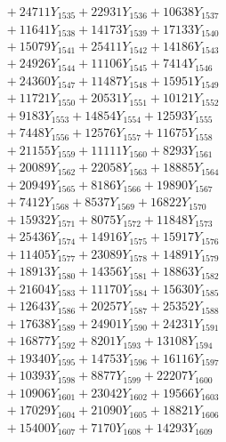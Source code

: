 \documentclass[a4paper,10pt]{article}
\begin{document}
{\begin{align}
&\;  + 24711 Y_{1535} + 22931 Y_{1536} + 10638 Y_{1537} \\[0.3ex]
&\;  + 11641 Y_{1538} + 14173 Y_{1539} + 17133 Y_{1540} \\[0.3ex]
&\;  + 15079 Y_{1541} + 25411 Y_{1542} + 14186 Y_{1543} \\[0.3ex]
&\;  + 24926 Y_{1544} + 11106 Y_{1545} + 7414 Y_{1546} \\[0.3ex]
&\;  + 24360 Y_{1547} + 11487 Y_{1548} + 15951 Y_{1549} \\[0.3ex]
&\;  + 11721 Y_{1550} + 20531 Y_{1551} + 10121 Y_{1552} \\[0.3ex]
&\;  + 9183 Y_{1553} + 14854 Y_{1554} + 12593 Y_{1555} \\[0.3ex]
&\;  + 7448 Y_{1556} + 12576 Y_{1557} + 11675 Y_{1558} \\[0.5ex]\allowbreak
&\;  + 21155 Y_{1559} + 11111 Y_{1560} + 8293 Y_{1561} \\[0.3ex]
&\;  + 20089 Y_{1562} + 22058 Y_{1563} + 18885 Y_{1564} \\[0.3ex]
&\;  + 20949 Y_{1565} + 8186 Y_{1566} + 19890 Y_{1567} \\[0.3ex]
&\;  + 7412 Y_{1568} + 8537 Y_{1569} + 16822 Y_{1570} \\[0.3ex]
&\;  + 15932 Y_{1571} + 8075 Y_{1572} + 11848 Y_{1573} \\[0.3ex]
&\;  + 25436 Y_{1574} + 14916 Y_{1575} + 15917 Y_{1576} \\[0.3ex]
&\;  + 11405 Y_{1577} + 23089 Y_{1578} + 14891 Y_{1579} \\[0.3ex]
&\;  + 18913 Y_{1580} + 14356 Y_{1581} + 18863 Y_{1582} \\[0.3ex]
&\;  + 21604 Y_{1583} + 11170 Y_{1584} + 15630 Y_{1585} \\[0.3ex]
&\;  + 12643 Y_{1586} + 20257 Y_{1587} + 25352 Y_{1588} \\[0.5ex]\allowbreak
&\;  + 17638 Y_{1589} + 24901 Y_{1590} + 24231 Y_{1591} \\[0.3ex]
&\;  + 16877 Y_{1592} + 8201 Y_{1593} + 13108 Y_{1594} \\[0.3ex]
&\;  + 19340 Y_{1595} + 14753 Y_{1596} + 16116 Y_{1597} \\[0.3ex]
&\;  + 10393 Y_{1598} + 8877 Y_{1599} + 22207 Y_{1600} \\[0.3ex]
&\;  + 10906 Y_{1601} + 23042 Y_{1602} + 19566 Y_{1603} \\[0.3ex]
&\;  + 17029 Y_{1604} + 21090 Y_{1605} + 18821 Y_{1606} \\[0.3ex]
&\;  + 15400 Y_{1607} + 7170 Y_{1608} + 14293 Y_{1609} \\[0.3ex]

\end{align}}
\end{document}
